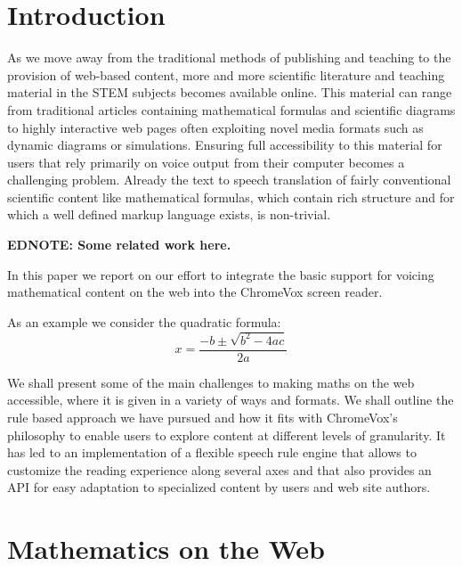 \documentclass{sig-alternate}
\newcommand\ednote[1]{\typeout{There is still a note!!!}%
  {\bf EDNOTE: #1}}
\begin{document}


\section{Introduction}\label{sec:intro} As we move away from the traditional
methods of publishing and teaching to the provision of web-based content, more
and more scientific literature and teaching material in the STEM subjects
becomes available online. This material can range from traditional articles
containing mathematical formulas and scientific diagrams to highly interactive
web pages often exploiting novel media formats such as dynamic diagrams or
simulations. Ensuring full accessibility to this material for users that rely
primarily on voice output from their computer becomes a challenging
problem. Already the text to speech translation of fairly conventional
scientific content like mathematical formulas, which contain rich structure and
for which a well defined markup language exists, is non-trivial.


\ednote{Some related work here.}

In this paper we report on our effort to integrate the basic support
for voicing mathematical content on the web into the ChromeVox screen
reader. 



As an example we consider the quadratic formula:
\begin{equation}
  \label{eq:quadratic}
  x=\frac{-b \pm \sqrt {b^2-4ac}}{2a}
\end{equation}


We shall present some of the main challenges to making maths
on the web accessible, where it is given in a variety of ways and
formats. We shall outline the rule based approach we have pursued and
how it fits with ChromeVox's philosophy to enable users to explore
content at different levels of granularity. It has led to an
implementation of a flexible speech rule engine that allows to
customize the reading experience along several axes and that also
provides an API for easy adaptation to specialized content by users
and web site authors.

\section{Mathematics on the Web}
\label{sec:math}
\end{document}
